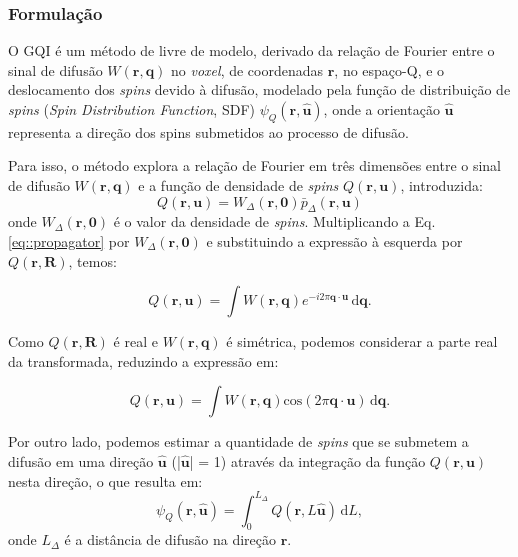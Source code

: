 \documentclass[
    12pt,                %
    oneside,            %
    a4paper,            %
    english,            %
    french,                %
    spanish,            %
    brazil                %
    ]{abntex2}
\begin{document}
\subsubsection{Formulação}
\label{ssec::gqi_formulacao}

O GQI é um método de livre de modelo, derivado da relação de Fourier entre o sinal de difusão $W(\mathbf{r},\mathbf{q})$ no \textit{voxel}, de coordenadas $\mathbf{r}$, no espaço-Q, e o deslocamento dos \textit{spins} devido à difusão, modelado pela função de distribuição de \textit{spins} (\textit{Spin Distribution Function}, SDF) $\psi_Q(\mathbf{r}, \mathbf{\hat{u}})$, onde a orientação $\mathbf{\hat{u}}$ representa a direção dos spins submetidos ao processo de difusão. %

Para isso, o método explora a relação de Fourier em três dimensões entre o sinal de difusão $W(\mathbf{r}, \mathbf{q})$ e a função de densidade de \textit{spins} $Q(\mathbf{r}, \mathbf{u})$, introduzida:
\begin{equation}
\label{eq::spin_densidade_presentacao}
    Q(\mathbf{r}, \mathbf{u}) = W_{\Delta}(\mathbf{r}, \mathbf{0}) \bar{p}_{\Delta}(\mathbf{r}, \mathbf{u})
\end{equation}
onde $W_{\Delta}(\mathbf{r}, \mathbf{0})$ é o valor da densidade de \textit{spins}. Multiplicando a Eq. \ref{eq::propagator} por  $W_{\Delta}(\mathbf{r}, \mathbf{0})$ e substituindo a expressão à esquerda por $Q(\mathbf{r}, \mathbf{R})$, temos:


\begin{equation}
\label{eq::spin_diffsignal_1}
    Q(\mathbf{r}, \mathbf{u}) =
    \int \! W(\mathbf{r}, \mathbf{q})e^{-i2\pi \mathbf{q}\cdot \mathbf{u} } \,\mathrm{d}\mathbf{q} .
\end{equation}

Como $Q(\mathbf{r}, \mathbf{R})$ é real e $W(\mathbf{r}, \mathbf{q})$ é simétrica, podemos considerar a parte real da transformada, reduzindo a expressão em:

\begin{equation}
\label{eq::spin_diffsignal_2}
    Q(\mathbf{r}, \mathbf{u}) =
     \int \! W(\mathbf{r}, \mathbf{q})\text{cos}(2\pi \mathbf{q}\cdot \mathbf{u}) \,\mathrm{d}\mathbf{q} .
\end{equation}

Por outro lado, podemos estimar a quantidade de \textit{spins} que se submetem a difusão em uma direção $\mathbf{\hat{u}}$ (|$\mathbf{\hat{u}}$| = 1) através da integração da função $Q(\mathbf{r}, \mathbf{u})$ nesta direção, o que resulta em:
\begin{equation}
\label{eq::sdf_spin}
    \psi_Q(\mathbf{r}, \mathbf{\hat{u}}) =
   \int_{0}^{L_{\Delta}} Q(\mathbf{r}, L\mathbf{\hat{u}})\!  \,\mathrm{d}L , 
\end{equation}
onde $L_\Delta$ é a distância de difusão na direção  $\mathbf{r}$.
\end{document}
